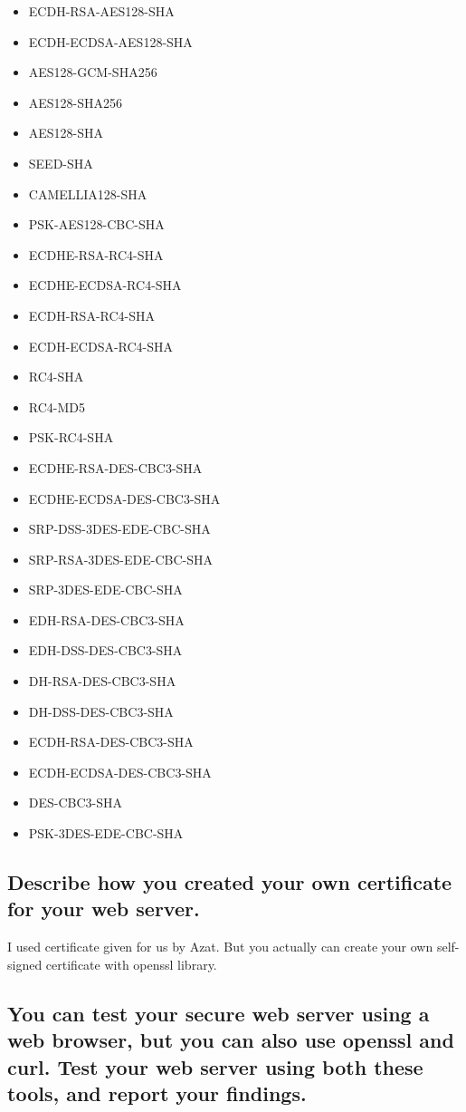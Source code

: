 \documentclass[a4paper,11pt]{article}
\begin{document}
\begin{itemize}
\item ECDH-RSA-AES128-SHA
\item ECDH-ECDSA-AES128-SHA
\item AES128-GCM-SHA256
\item AES128-SHA256
\item AES128-SHA
\item SEED-SHA
\item CAMELLIA128-SHA
\item PSK-AES128-CBC-SHA
\item ECDHE-RSA-RC4-SHA
\item ECDHE-ECDSA-RC4-SHA
\item ECDH-RSA-RC4-SHA
\item ECDH-ECDSA-RC4-SHA
\item RC4-SHA
\item RC4-MD5
\item PSK-RC4-SHA
\item ECDHE-RSA-DES-CBC3-SHA
\item ECDHE-ECDSA-DES-CBC3-SHA
\item SRP-DSS-3DES-EDE-CBC-SHA
\item SRP-RSA-3DES-EDE-CBC-SHA
\item SRP-3DES-EDE-CBC-SHA
\item EDH-RSA-DES-CBC3-SHA
\item EDH-DSS-DES-CBC3-SHA
\item DH-RSA-DES-CBC3-SHA
\item DH-DSS-DES-CBC3-SHA
\item ECDH-RSA-DES-CBC3-SHA
\item ECDH-ECDSA-DES-CBC3-SHA
\item DES-CBC3-SHA
\item PSK-3DES-EDE-CBC-SHA
\end{itemize}

\subsection{Describe how you created your own certificate for your web server.}
I used certificate given for us by Azat. But you actually can create your own self-signed certificate with openssl library.

\subsection{You can test your secure web server using a web browser, but you can also use openssl and curl. Test your web server using both these tools, and report your findings.}
\end{document}
